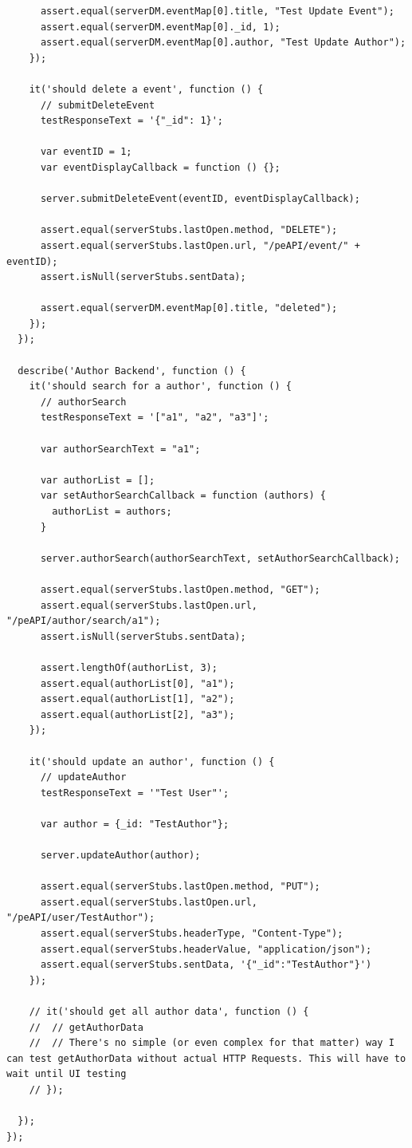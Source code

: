 \documentclass[12pt]{ucthesis}
\begin{document}
\begin{lstlisting}
      assert.equal(serverDM.eventMap[0].title, "Test Update Event");
      assert.equal(serverDM.eventMap[0]._id, 1);
      assert.equal(serverDM.eventMap[0].author, "Test Update Author");
    });

    it('should delete a event', function () {
      // submitDeleteEvent
      testResponseText = '{"_id": 1}';

      var eventID = 1;
      var eventDisplayCallback = function () {};

      server.submitDeleteEvent(eventID, eventDisplayCallback);

      assert.equal(serverStubs.lastOpen.method, "DELETE");
      assert.equal(serverStubs.lastOpen.url, "/peAPI/event/" + eventID);
      assert.isNull(serverStubs.sentData);

      assert.equal(serverDM.eventMap[0].title, "deleted");
    });
  });

  describe('Author Backend', function () {
    it('should search for a author', function () {
      // authorSearch
      testResponseText = '["a1", "a2", "a3"]';

      var authorSearchText = "a1";

      var authorList = [];
      var setAuthorSearchCallback = function (authors) {
        authorList = authors;
      }

      server.authorSearch(authorSearchText, setAuthorSearchCallback);

      assert.equal(serverStubs.lastOpen.method, "GET");
      assert.equal(serverStubs.lastOpen.url, "/peAPI/author/search/a1");
      assert.isNull(serverStubs.sentData);

      assert.lengthOf(authorList, 3);
      assert.equal(authorList[0], "a1");
      assert.equal(authorList[1], "a2");
      assert.equal(authorList[2], "a3");
    });

    it('should update an author', function () {
      // updateAuthor
      testResponseText = '"Test User"';

      var author = {_id: "TestAuthor"};

      server.updateAuthor(author);

      assert.equal(serverStubs.lastOpen.method, "PUT");
      assert.equal(serverStubs.lastOpen.url, "/peAPI/user/TestAuthor");
      assert.equal(serverStubs.headerType, "Content-Type");
      assert.equal(serverStubs.headerValue, "application/json");
      assert.equal(serverStubs.sentData, '{"_id":"TestAuthor"}')
    });

    // it('should get all author data', function () {
    //  // getAuthorData
    //  // There's no simple (or even complex for that matter) way I can test getAuthorData without actual HTTP Requests. This will have to wait until UI testing 
    // });
    
  });
});
\end{lstlisting}
\end{document}
